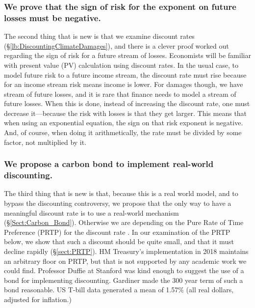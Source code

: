 \documentclass{article}
\begin{document}
\subsubsection{We prove that the sign of risk for the exponent on future losses must be negative.} The second thing that is new is that we examine discount rates (\S\ref{lb:DiscountingClimateDamages}), and there is a clever proof worked out regarding the sign of risk for a future stream of losses. Economists will be familiar with present value (PV) calculation using discount rates. In the usual case, to model future risk to a future income stream, the discount rate must rise because for an income stream risk means income is lower. For damages though, we have stream of future losses, and it is rare that finance needs to model a stream of future losses. When this is done, instead of increasing the discount rate, one must decrease it---because the risk with losses is that they get larger. This means that when using an exponential equation, the sign on that risk exponent is negative. And, of course, when doing it arithmetically, the rate must be divided by some factor, not multiplied by it.

\subsubsection{We propose a carbon bond to implement real-world discounting.} The third thing that is new is that, because this is a real world model, and to bypass the discounting controversy, we propose that the only way to have a meaningful discount rate is to use a real-world mechanism (\S\ref{Sect:Carbon_Bond}). Otherwise we are depending on the Pure Rate of Time Preference (PRTP) for the discount rate \cite{Kelleher_2017PRTP(RPTP)}. In our examination of the PRTP below, we show that such a discount should be quite small, and that it must decline rapidly (\S\ref{sect:PRTP}). HM Treasury's implementation in 2018 maintains an arbitrary floor on PRTP, but that is not supported by any academic work we could find. Professor Duffie at Stanford was kind enough to suggest the use of a bond for implementing discounting. Gardiner made the 300 year term of such a bond reasonable. US T-bill data generated a mean of 1.57\% (all real dollars, adjusted for inflation.)
\end{document}
